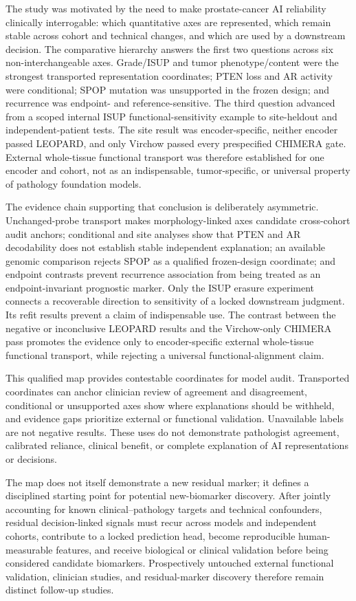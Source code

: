 The study was motivated by the need to make prostate-cancer AI reliability clinically
interrogable: which quantitative axes are represented, which remain stable across cohort and
technical changes, and which are used by a downstream decision. The comparative hierarchy
answers the first two questions across six non-interchangeable axes. Grade/ISUP and tumor
phenotype/content were the strongest transported representation coordinates; PTEN loss and AR
activity were conditional; SPOP mutation was unsupported in the frozen design; and recurrence
was endpoint- and reference-sensitive. The third question advanced from a scoped internal ISUP
functional-sensitivity example to site-heldout and independent-patient tests. The site result was
encoder-specific, neither encoder passed LEOPARD, and only Virchow passed every prespecified
CHIMERA gate. External whole-tissue functional transport was therefore established for one
encoder and cohort, not as an indispensable, tumor-specific, or universal property of pathology
foundation models.

The evidence chain supporting that conclusion is deliberately asymmetric. Unchanged-probe
transport makes morphology-linked axes candidate cross-cohort audit anchors; conditional and
site analyses show that PTEN and AR decodability does not establish stable independent
explanation; an available genomic comparison rejects SPOP as a qualified frozen-design
coordinate; and endpoint contrasts prevent recurrence association from being treated as an
endpoint-invariant prognostic marker. Only the ISUP erasure experiment connects a recoverable
direction to sensitivity of a locked downstream judgment. Its refit results prevent a claim of
indispensable use. The contrast between the negative or inconclusive LEOPARD results and the
Virchow-only CHIMERA pass promotes the evidence only to encoder-specific external whole-tissue
functional transport, while rejecting a universal functional-alignment claim.

This qualified map provides contestable coordinates for model audit. Transported coordinates
can anchor clinician review of agreement and disagreement, conditional or unsupported axes show
where explanations should be withheld, and evidence gaps prioritize external or functional
validation. Unavailable labels are not negative results. These uses do not demonstrate
pathologist agreement, calibrated reliance, clinical
benefit, or complete explanation of AI representations or decisions.

The map does not itself demonstrate a new residual marker; it defines a disciplined starting
point for potential new-biomarker discovery. After jointly accounting for known
clinical--pathology targets and technical confounders, residual decision-linked signals must
recur across models and independent cohorts, contribute to a locked prediction head, become
reproducible human-measurable features, and receive biological or clinical validation before
being considered candidate biomarkers. Prospectively untouched external functional validation,
clinician studies, and residual-marker discovery therefore remain distinct follow-up studies.
